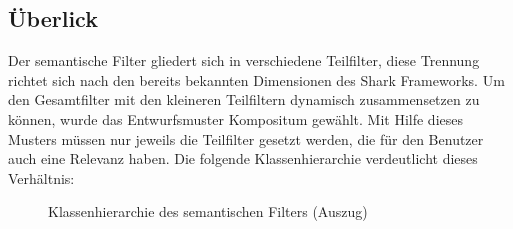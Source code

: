 \subsection{Überlick}\label{ch:filtercomps}
Der semantische Filter gliedert sich in verschiedene Teilfilter, diese Trennung richtet sich nach den bereits bekannten Dimensionen des Shark Frameworks. Um den Gesamtfilter mit den kleineren Teilfiltern dynamisch zusammensetzen zu können, wurde das Entwurfsmuster Kompositum gewählt. Mit Hilfe dieses Musters müssen nur jeweils die Teilfilter gesetzt werden, die für den Benutzer auch eine Relevanz haben. Die folgende Klassenhierarchie verdeutlicht dieses Verhältnis:
\begin{figure}[H]
	\centering
	\hspace*{1cm}
	\caption{Klassenhierarchie des semantischen Filters (Auszug)}
	\label{fig:broadcastStructure}
\end{figure} 
